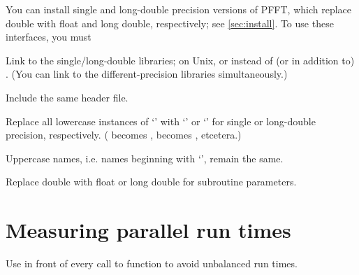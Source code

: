You can install single and long-double precision versions of PFFT, which replace double with float and long double, respectively; see \ref{sec:install}.
To use these interfaces, you must
\begin{compactitem}
  \item Link to the single/long-double libraries; on Unix,  or  instead of (or in addition to) .
        (You can link to the different-precision libraries simultaneously.)
  \item Include the same  header file.
  \item Replace all lowercase instances of ‘’ with ‘’ or ‘’ for single or long-double precision, respectively.
        ( becomes ,  becomes , etcetera.)
  \item Uppercase names, i.e. names beginning with ‘’, remain the same.
  \item Replace double with float or long double for subroutine parameters.
\end{compactitem}

\section{Measuring parallel run times}
Use  in front of every call to  function to avoid unbalanced run times.
